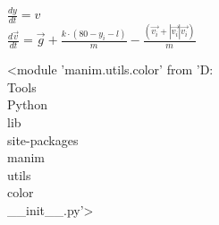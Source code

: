 \documentclass[preview]{standalone}
\begin{document}
\begin{center}
\begin{flushleft}
                        $\frac{dy}{dt}=v$ \\
                        $\frac{d\vec{v}}{dt}=\vec{g}+\frac{k\cdot(80-y_i-l)}{m}-\frac{(\vec{v_i}+|\vec{v_i}|\vec{v_i})}{m}$
                        \end{flushleft}
                        <module 'manim.utils.color' from 'D:\\Tools\\Python\\lib\\site-packages\\manim\\utils\\color\\__init__.py'>
\end{center}
\end{document}
